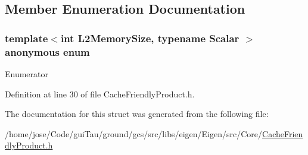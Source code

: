 \subsection{Member Enumeration Documentation}
\hypertarget{structei___l2__block__traits_a6e111d07131243e63afb82888a6a7fb9}{\subsubsection[{anonymous enum}]{\setlength{\rightskip}{0pt plus 5cm}template$<$int L2\-Memory\-Size, typename Scalar $>$ anonymous enum}}\label{structei___l2__block__traits_a6e111d07131243e63afb82888a6a7fb9}
\begin{Desc}
\item[Enumerator]\par
\begin{description}
\item[{\em 
\hypertarget{structei___l2__block__traits_a6e111d07131243e63afb82888a6a7fb9a5ce63fecdba0398317452589d176d76e}{width}\label{structei___l2__block__traits_a6e111d07131243e63afb82888a6a7fb9a5ce63fecdba0398317452589d176d76e}
}]\end{description}
\end{Desc}


Definition at line 30 of file Cache\-Friendly\-Product.\-h.



The documentation for this struct was generated from the following file\-:\begin{DoxyCompactItemize}
\item 
/home/jose/\-Code/gui\-Tau/ground/gcs/src/libs/eigen/\-Eigen/src/\-Core/\hyperlink{_cache_friendly_product_8h}{Cache\-Friendly\-Product.\-h}\end{DoxyCompactItemize}
